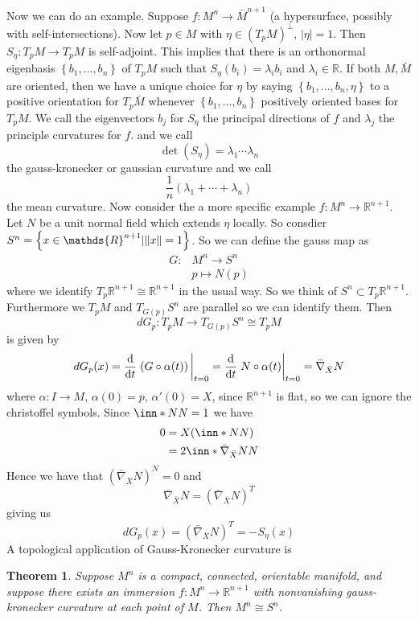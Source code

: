 \documentclass[a4paper]{article}
\newtheorem*{thm}{Theorem}
\begin{document}
Now we can do an example. Suppose $f:M^n \rightarrow \bar{M}^{n+1}$ (a hypersurface, possibly with self-intersections). Now let $p \in M$ with $\eta \in (T_pM)^\perp$, $|\eta| = 1$. Then $S_\eta: T_pM \rightarrow T_pM$ is self-adjoint. This implies that there is an orthonormal eigenbasis $\left\{ b_1, \dots, b_n \right\}$ of $T_pM$ such that $S_\eta(b_i) = \lambda_i b_i$ and $\lambda_i \in \mathds{R}$. If both $M, \bar{M}$ are oriented, then we have a unique choice for $\eta$ by saying $\left\{ b_1, \dots, b_n, \eta \right\}$ to a positive orientation for $T_p\bar{M}$ whenever $\left\{ b_1, \dots, b_n \right\}$ positively oriented bases for $T_pM$. We call the eigenvectors $b_j$ for $S_\eta$ the principal directions of $f$ and $\lambda_j$ the principle curvatures for $f$. and we call
\[
  \det (S_\eta) = \lambda_1 \cdots \lambda_n
\]
the gauss-kronecker or gaussian curvature and we call 
\[
  \frac{1}{n}\left( \lambda_1 + \cdots + \lambda_n \right)
\]
the mean curvature. 
Now consider the a more specific example $f: M^n \rightarrow \mathds{R}^{n+1}$. Let $N$ be a unit normal field which extends $\eta$ locally. So consdier $S^n = \left\{ x \in \mathds{R}^{n+1} | \norm{x} = 1 \right\}$. So we can define the gauss map as
\[
  \begin{aligned}
    G:& M^n \rightarrow S^n \\
      & p \mapsto N(p)
  \end{aligned}
\]
where we identify $T_p\mathds{R}^{n+1} \cong \mathds{R}^{n+1}$ in the usual way. So we think of $S^n \subset T_p\mathds{R}^{n+1}$. Furthermore we $T_pM$ and $T_{G(p)}S^n$ are parallel so we can identify them. Then 
\[
  dG_p:T_pM \rightarrow T_{G(p)}S^n \cong T_pM
\]
is given by
\[
  dG_p(x) = \dv{t} \eval{\left( G \circ \alpha(t) \right)}_{t=0} = \dv{t} \eval{N \circ \alpha(t)}_{t=0} = \bar{\nabla}_{\bar{X}} N
\]
where $\alpha:I \rightarrow M$, $\alpha(0) = p$, $\alpha'(0) = X$, since $\mathds{R}^{n+1}$ is flat, so we can ignore the christoffel symbols. Since $\inn*{N}{N} = 1$ we have
\[
  \begin{aligned}
    0 &= X(\inn*{N}{N}) \\
      &= 2 \inn*{\bar{\nabla}_{\bar{X}}N}{N}
  \end{aligned}
\]
Hence we have that $(\bar{\nabla}_{\bar{X}}N)^N = 0$ and 
\[
  \bar{\nabla}_{\bar{X}}N = \left( \bar{\nabla}_{\bar{X}} N \right)^T
\]
giving us
\[
  dG_p(x) = \left( \bar{\nabla}_{\bar{X}}N \right)^T = -S_\eta (x)
\]
A topological application of Gauss-Kronecker curvature is
\begin{thm}
  Suppose $M^n$ is a compact, connected, orientable manifold, and suppose there exists an immersion $f: M^n \rightarrow \mathds{R}^{n+1}$ with nonvanishing gauss-kronecker curvature at each point of $M$. Then $M^n \cong S^n$.
\end{thm}
\end{document}
